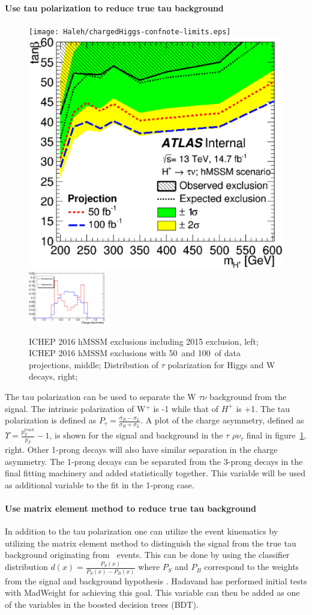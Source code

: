 \paragraph{Use tau polarization to reduce true tau background}
\begin{figure}\label{fig:plot1}
\begin{center}
\texttt{[image: Haleh/chargedHiggs-confnote-limits.eps]}
\includegraphics[height=0.27\textwidth]{Haleh/WithProjection_exclusion_run2016taunu_v2_hmssm_taunu.eps}
\includegraphics[height=0.25\textwidth, width=0.30\textwidth]{Haleh/tauAsy.eps}
\caption{ ICHEP 2016 hMSSM exclusions including 2015 exclusion, left; ICHEP 2016 hMSSM exclusions with 50\invfb\ and 100\invfb\ of data projections, middle; Distribution of $\tau$ polarization for Higgs and W decays, right;}
\label{fig:tau}
\end{center}
\end{figure}
The tau polarization can be used to separate the W \too $\tau \nu$ background from the signal.  The intrinsic polarization of W$^+$ is -1 while that of $H^+$ is +1.  The tau polarization is defined as $P_{\tau}=\frac{\sigma_R - \sigma_L}{\sigma_R + \sigma_L}$.
A plot of the charge asymmetry, defined as $\Upsilon=\frac{p_{T}^{track}}{p_T} - 1$, is shown for the signal and background in the $\tau$ \too $\rho \nu_{\tau}$ final in figure~\ref{fig:tau}, right. Other 1-prong decays will also have similar separation in the charge asymmetry. 
The 1-prong decays can be separated from the 3-prong decays in the final fitting machinery and added statistically together.  This variable will be used as additional variable to the fit in the 1-prong case.

\paragraph{Use matrix element method to reduce true tau background}
In addition to the tau polarization one can utilize the event kinematics by utilizing the matrix element method to distinguish the signal from the true tau background originating from \ttbar\ events.  
This can be done by using the classifier distribution $d(x)=\frac{P_S(x)}{P_S(x)-P_B(x)}$ where $P_S$ and $P_B$ correspond to the weights from the signal and background 
hypothesis . Hadavand has performed initial tests with MadWeight for achieving this goal. This variable can then be added as one of the variables in the boosted decision trees (BDT). 

